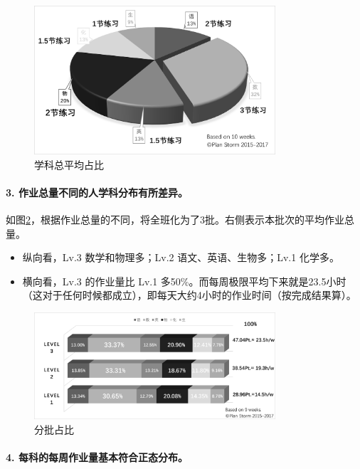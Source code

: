 \documentclass[a4paper,12pt]{article}
\begin{document}
\begin{CJK}{UTF8}{song}
\begin{figure}[H]
    \centering
    \includegraphics[width=0.8\textwidth]{img/2.png}
    \caption{学科总平均占比}
    \label{ratio}
\end{figure}

\paragraph{3. 作业总量不同的人学科分布有所差异。 } 如图\ref{lv}，根据作业总量的不同，将全班化为了3批。右侧表示本批次的平均作业总量。
\begin{itemize}
    \item 纵向看，Lv.3 数学和物理多；Lv.2 语文、英语、生物多；Lv.1 化学多。
    \item 横向看，Lv.3 的作业量比 Lv.1 多50\%。而每周极限平均下来就是23.5小时（这对于任何时候都成立），即每天大约4小时的作业时间（按完成结果算）。
\end{itemize}

\begin{figure}[H]
    \centering
    \includegraphics[width=0.8\textwidth]{img/3.png}
    \caption{分批占比}
    \label{lv}
\end{figure}

\paragraph{4. 每科的每周作业量基本符合正态分布。} 


\end{CJK}
\end{document}
